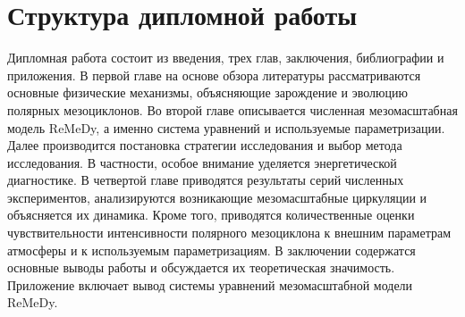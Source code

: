 \section{Структура дипломной работы}
Дипломная работа состоит из введения, трех глав, заключения, библиографии и приложения. В первой главе на основе обзора литературы рассматриваются основные физические механизмы, объясняющие зарождение и эволюцию полярных мезоциклонов. Во второй главе описывается численная мезомасштабная модель ReMeDy, а именно система уравнений и используемые параметризации. Далее производится постановка стратегии исследования и выбор метода исследования. В частности, особое внимание уделяется энергетической диагностике. В четвертой главе приводятся результаты серий численных экспериментов, анализируются возникающие мезомасштабные циркуляции и объясняется их динамика. Кроме того, приводятся количественные оценки чувствительности интенсивности полярного мезоциклона к внешним параметрам атмосферы и к используемым параметризациям. В заключении содержатся основные выводы работы и обсуждается их теоретическая значимость. Приложение включает вывод системы уравнений мезомасштабной модели ReMeDy.

%
